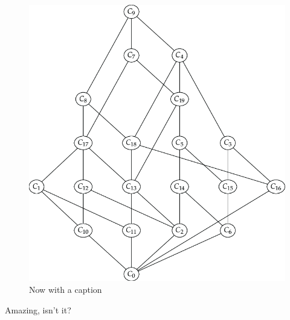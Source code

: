 \documentclass{article}
\begin{document}
  \begin{figure}[h]
  
    \caption{Now with a caption}
    \includegraphics{complete_lattice}
  
  \end{figure}
  
  Amazing, isn't it?
\end{document}
